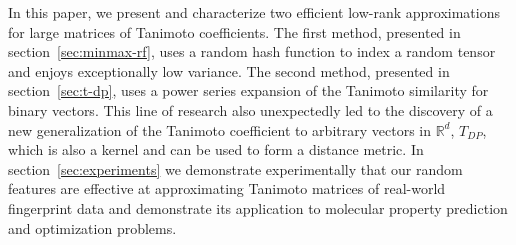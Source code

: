 In this paper, we present and characterize two efficient low-rank approximations for large matrices of Tanimoto coefficients.
The first method, presented in section~\ref{sec:minmax-rf},
uses a random hash function to index a random tensor
and enjoys exceptionally low variance.
The second method, presented in section~\ref{sec:t-dp},
uses a power series expansion of the Tanimoto similarity for binary vectors.
This line of research also unexpectedly led to the discovery of a new generalization
of the Tanimoto coefficient to arbitrary vectors in $\mathbb{R}^d$, $T_{DP}$,
which is also a kernel and can be used to form a distance metric.
In section~\ref{sec:experiments} we demonstrate experimentally
that our random features are effective at approximating
Tanimoto matrices of real-world fingerprint data
and demonstrate its application to molecular property prediction and optimization problems.






